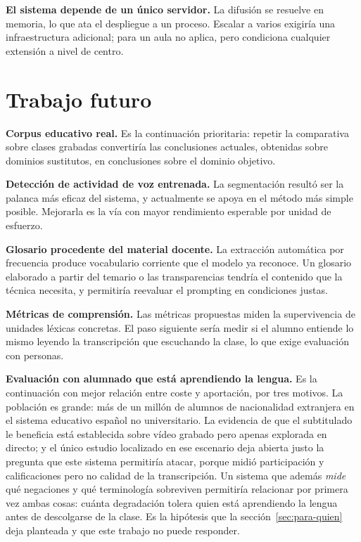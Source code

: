 \textbf{El sistema depende de un único servidor.} La difusión se resuelve en memoria, lo
que ata el despliegue a un proceso. Escalar a varios exigiría una infraestructura
adicional; para un aula no aplica, pero condiciona cualquier extensión a nivel de centro.

\section{Trabajo futuro}

\textbf{Corpus educativo real.} Es la continuación prioritaria: repetir la comparativa
sobre clases grabadas convertiría las conclusiones actuales, obtenidas sobre dominios
sustitutos, en conclusiones sobre el dominio objetivo.

\textbf{Detección de actividad de voz entrenada.} La segmentación resultó ser la palanca
más eficaz del sistema, y actualmente se apoya en el método más simple posible. Mejorarla
es la vía con mayor rendimiento esperable por unidad de esfuerzo.

\textbf{Glosario procedente del material docente.} La extracción automática por frecuencia
produce vocabulario corriente que el modelo ya reconoce. Un glosario elaborado a partir del
temario o las transparencias tendría el contenido que la técnica necesita, y permitiría
reevaluar el prompting en condiciones justas.

\textbf{Métricas de comprensión.} Las métricas propuestas miden la supervivencia de
unidades léxicas concretas. El paso siguiente sería medir si el alumno entiende lo mismo
leyendo la transcripción que escuchando la clase, lo que exige evaluación con personas.

\textbf{Evaluación con alumnado que está aprendiendo la lengua.} Es la continuación con
mejor relación entre coste y aportación, por tres motivos. La población es grande: más de un
millón de alumnos de nacionalidad extranjera en el sistema educativo español no
universitario. La evidencia de que el subtitulado le beneficia está establecida sobre vídeo
grabado \cite{monteroperez2013meta, gernsbacher2015captions} pero apenas explorada en
directo; y el único estudio localizado en ese escenario \cite{wang2023transcripts} deja
abierta justo la pregunta que este sistema permitiría atacar, porque midió participación y
calificaciones pero no calidad de la transcripción. Un sistema que además \emph{mide} qué
negaciones y qué terminología sobreviven permitiría relacionar por primera vez ambas cosas:
cuánta degradación tolera quien está aprendiendo la lengua antes de descolgarse de la clase.
Es la hipótesis que la sección~\ref{sec:para-quien} deja planteada y que este trabajo no
puede responder.

